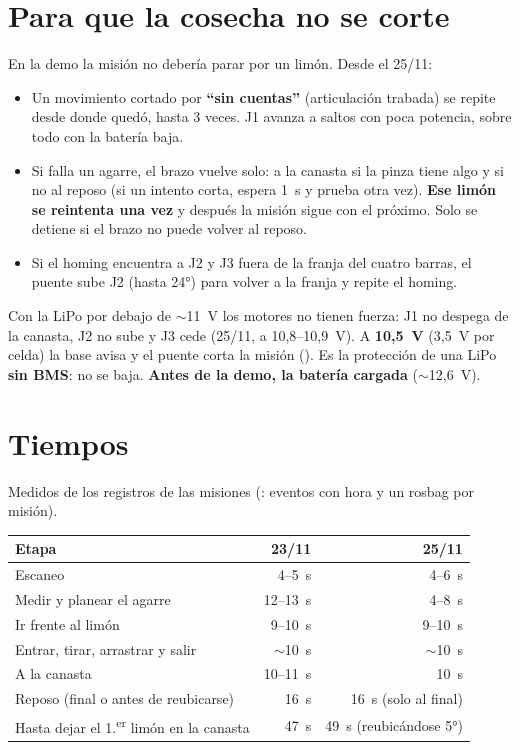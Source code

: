 \section{Para que la cosecha no se corte}

En la demo la misión no debería parar por un limón. Desde el 25/11:

\begin{itemize}
  \item Un movimiento cortado por \textbf{``sin cuentas''} (articulación trabada) se repite desde donde quedó, hasta 3
        veces. J1 avanza a saltos con poca potencia, sobre todo con la batería baja.
  \item Si falla un agarre, el brazo vuelve solo: a la canasta si la pinza tiene algo y si no al reposo (si un intento
        corta, espera 1~s y prueba otra vez). \textbf{Ese limón se reintenta una vez} y después la misión sigue con
        el próximo. Solo se detiene si el brazo no puede volver al reposo.
  \item Si el homing encuentra a J2 y J3 fuera de la franja del cuatro barras, el puente sube J2 (hasta 24°) para
        volver a la franja y repite el homing.
\end{itemize}

\begin{peligro}[La batería]
Con la LiPo por debajo de $\sim$11~V los motores no tienen fuerza: J1 no despega de la canasta, J2 no sube y J3 cede
(25/11, a 10,8--10,9~V). A \textbf{10,5~V} (3,5~V por celda) la base avisa  y el puente corta la
misión (). Es la protección de una LiPo \textbf{sin BMS}: no se baja. \textbf{Antes de la
demo, la batería cargada} ($\sim$12,6~V).
\end{peligro}

\section{Tiempos}

Medidos de los registros de las misiones (: eventos con
hora y un rosbag por misión).

\begin{center}
\begin{tabular}{@{}lrr@{}}
\toprule
\textbf{Etapa} & \textbf{23/11} & \textbf{25/11} \\
\midrule
Escaneo & 4--5~s & 4--6~s \\
Medir y planear el agarre & 12--13~s & 4--8~s \\
Ir frente al limón & 9--10~s & 9--10~s \\
Entrar, tirar, arrastrar y salir & $\sim$10~s & $\sim$10~s \\
A la canasta & 10--11~s & 10~s \\
Reposo (final o antes de reubicarse) & 16~s & 16~s (solo al final) \\
\midrule
Hasta dejar el 1.\textsuperscript{er} limón en la canasta & 47~s & 49~s (reubicándose 5°) \\
\bottomrule
\end{tabular}
\end{center}

